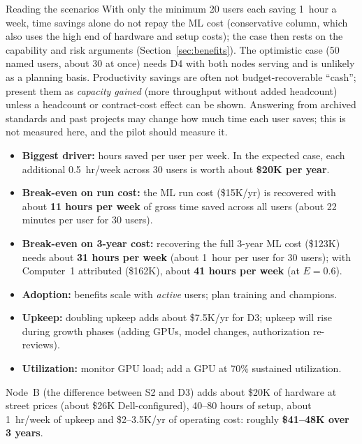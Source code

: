 \begin{ReportNote}{Reading the scenarios}
With only the minimum 20 users each saving 1~hour a week, time savings alone do not
repay the ML cost (conservative column, which also uses the high end of hardware and
setup costs); the case then rests on the capability and risk arguments
(Section~\ref{sec:benefits}). The optimistic case (50 named users, about 30 at once) needs
D4 with both nodes serving and is unlikely as a planning basis. Productivity savings are
often not budget-recoverable ``cash''; present them as \emph{capacity gained} (more
throughput without added headcount) unless a headcount or contract-cost effect can be
shown. Answering from archived standards and past projects may change how much time each
user saves; this is not measured here, and the pilot should measure it.
\end{ReportNote}

\begin{itemize}
  \item \textbf{Biggest driver:} hours saved per user per week. In the expected case,
    each additional 0.5~hr/week across 30 users is worth about \textbf{\$20K per year}.
  \item \textbf{Break-even on run cost:} the ML run cost (\$15K/yr) is recovered with
    about \textbf{11 hours per week} of gross time saved across all users (about 22
    minutes per user for 30 users).
  \item \textbf{Break-even on 3-year cost:} recovering the full 3-year ML cost (\$123K)
    needs about \textbf{31 hours per week} (about 1~hour per user for 30 users); with
    Computer~1 attributed (\$162K), about \textbf{41 hours per week} (at $E = 0.6$).
  \item \textbf{Adoption:} benefits scale with \emph{active} users; plan training and
    champions.
  \item \textbf{Upkeep:} doubling upkeep adds about \$7.5K/yr for D3; upkeep will rise
    during growth phases (adding GPUs, model changes, authorization re-reviews).
  \item \textbf{Utilization:} monitor GPU load; add a GPU at 70\% sustained utilization.
\end{itemize}


Node~B (the difference between S2 and D3) adds about \$20K of hardware at street prices
(about \$26K Dell-configured), 40--80 hours of setup, about 1~hr/week of upkeep and
\$2--3.5K/yr of operating cost: roughly \textbf{\$41--48K over 3 years}.

